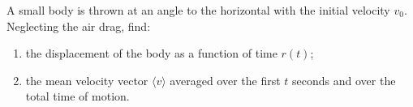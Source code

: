 
\item A small body is thrown at an angle to the horizontal with the initial velocity \( v_0 \). Neglecting the air drag, find:
    \begin{enumerate}
        \item the displacement of the body as a function of time \( r(t) \);
        \item the mean velocity vector \( \langle v \rangle \) averaged over the first \( t \) seconds and over the total time of motion.
    \end{enumerate}
